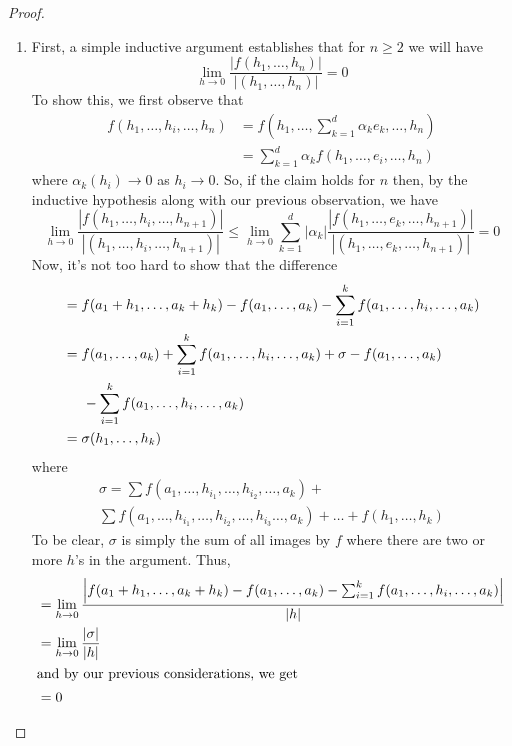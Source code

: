 \begin{enumerate}
\begin{proof}
\begin{enumerate}
        \item First, a simple inductive argument establishes that for \( n \geq 2 \) we will have
        \[
        \lim_{h \rightarrow 0} \frac{\left| f(h_1,\ldots,h_n) \right|}{\left| (h_1,\ldots, h_n) \right|} = 0
        \]
        To show this, we first observe that
        \begin{align*}
            f(h_1,\ldots,h_i,\ldots,h_n) &= f\left(h_1,\ldots,\sum_{k=1}^d\alpha_ke_k,\ldots,h_n  \right) \\
            &= \sum_{k=1}^d \alpha_kf(h_1,\ldots,e_i,\ldots,h_n)
        \end{align*}
        where \( \alpha_k(h_i) \rightarrow 0 \) as \( h_i \rightarrow 0 \). So, if the claim holds for \( n \) then, by the inductive hypothesis along with our previous observation, we have
        \[
            \lim_{h \rightarrow 0} \frac{\left| f(h_1,\ldots,h_i,\ldots,h_{n+1}) \right|}{\left| (h_1,\ldots,h_i,\ldots,h_{n+1}) \right|} \leq \lim_{h \rightarrow 0} \sum_{k=1}^d \left| \alpha_k \right|\frac{\left| f(h_1,\ldots,e_k,\ldots,h_{n+1}) \right|}{\left| (h_1,\ldots,e_k,\ldots,h_{n+1}) \right|} = 0
        \]
        Now, it's not too hard to show that the difference
        \begin{align*}
        &= f(a_1+h_1,\ldots,a_k+h_k) - f(a_1,\ldots,a_k)-\sum_{i=1}^k f(a_1,\ldots,h_i,\ldots,a_k)\\
        &= f(a_1,\ldots,a_k) + \sum_{i=1}^k f(a_1,\ldots,h_i,\ldots,a_k) + \sigma - f(a_1,\ldots,a_k) \\
        & \hspace{5mm}- \sum_{i=1}^k f(a_1,\ldots,h_i,\ldots,a_k) \\
        &= \sigma(h_1,\ldots,h_k)
        \end{align*}
        where 
        \begin{multline*}
        \sigma = \sum f(a_1,\ldots,h_{i_1},\ldots,h_{i_2},\ldots,a_k) + \\ \sum f(a_1,\ldots,h_{i_1},\ldots,h_{i_2},\ldots,h_{i_3}\ldots, a_k) + \ldots + f(h_1,\ldots,h_k)
        \end{multline*}
        To be clear, \( \sigma \) is simply the sum of all images by \( f \) where there are two or more \( h\)'s in the argument. Thus,
        \begin{align*}
            &= \lim_{h \rightarrow 0} \frac{\left|f(a_1+h_1,\ldots,a_k+h_k) - f(a_1,\ldots,a_k)-\sum_{i=1}^k f(a_1,\ldots,h_i,\ldots,a_k) \right|}{\left| h \right|}\\
            &= \lim_{h \rightarrow 0} \frac{\left| \sigma \right|}{\left| h \right|} \\
            \intertext{and by our previous considerations, we get}
            &= 0
        \end{align*}
    \end{enumerate}
    \end{proof}
    

\end{enumerate}
